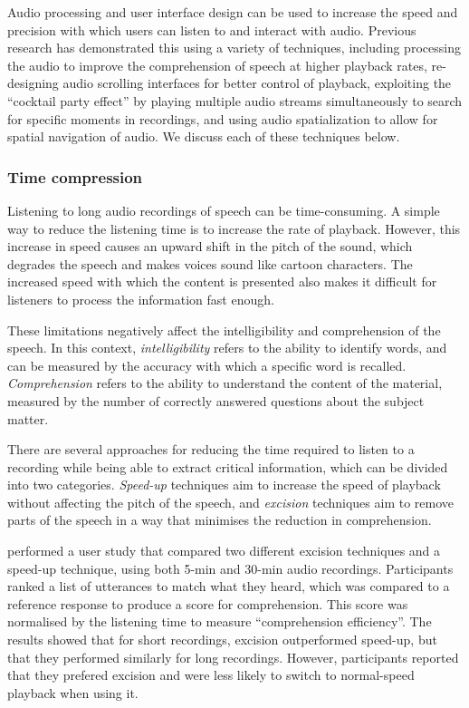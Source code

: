 Audio processing and user interface design can be used to increase the speed and precision with which users can listen
to and interact with audio. Previous research has demonstrated this using a variety of techniques, including processing
the audio to improve the comprehension of speech at higher playback rates, re-designing audio scrolling interfaces for
better control of playback, exploiting the ``cocktail party effect'' by playing multiple audio streams simultaneously
to search for specific moments in recordings, and using audio spatialization to allow for spatial navigation of audio.
We discuss each of these techniques below.

\subsubsection{Time compression}

Listening to long audio recordings of speech can be time-consuming. A simple way to reduce the listening time is to
increase the rate of playback.  However, this increase in speed causes an upward shift in the pitch of the sound, which
degrades the speech and makes voices sound like cartoon characters.  The increased speed with which the content is
presented also makes it difficult for listeners to process the information fast enough.

These limitations negatively affect the intelligibility and comprehension of the speech.  In this context,
\textit{intelligibility} refers to the ability to identify words, and can be measured by the accuracy with which a
specific word is recalled. \textit{Comprehension} refers to the ability to understand the content of the material,
measured by the number of correctly answered questions about the subject matter.


There are several approaches for reducing the time required to listen to a recording while being able to extract
critical information, which can be divided into two categories. \textit{Speed-up} techniques aim to increase the speed
of playback without affecting the pitch of the speech, and \textit{excision} techniques aim to remove parts of the
speech in a way that minimises the reduction in comprehension.

\citet{Tucker2006} performed a user study that compared two different excision techniques and a speed-up technique,
using both 5-min and 30-min audio recordings.  Participants ranked a list of utterances to match what they heard,
which was compared to a reference response to produce a score for comprehension. This score was normalised by the
listening time to measure ``comprehension efficiency''.  The results showed that for short recordings, excision
outperformed speed-up, but that they performed similarly for long recordings. However, participants reported that they
prefered excision and were less likely to switch to normal-speed playback when using it.

